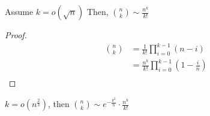 \begin{lemma}
    Assume $k = o(\sqrt{n})$ Then, $\binom{n}{k} \sim \frac{n^k}{k!}$
\end{lemma}
\begin{proof}
    \begin{align*}
        \binom{n}{k} &= \frac{1}{k!}\prod_{i = 0}^{k - 1} (n - i) \\
        &= \frac{n^k}{k!}\prod_{i = 0}^{k - 1} \left(1 - \frac{i}{n}\right) \\
    \end{align*}
\end{proof}

\begin{remark}
    $k = o\left(n^{\frac{2}{3}}\right)$, then $\binom{n}{k} \sim e^{-\frac{k^2}{n}}\cdot\frac{n^k}{k!}$
\end{remark}